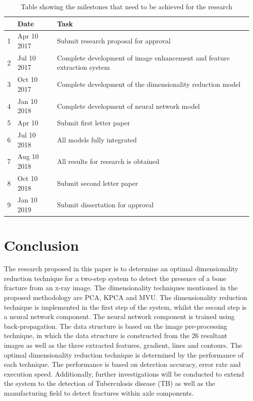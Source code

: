 \documentclass[11pt]{article}
\begin{document}
	\begin{table}[!h]
		\centering
		\caption{Table showing the milestones that need to be achieved for the research}
		\label{tb: milestones}
		\begin{tabular}{| c | l | p{11cm} |}
			\hline 
			& Date & Task \\
			\hline \hline
			1 & Apr 10 2017 & Submit research proposal for approval\\
			\hline
			2 & Jul 10 2017 & Complete development of image enhancement and feature extraction system \\
			\hline
			3 & Oct 10 2017 & Complete development of the dimensionality reduction model \\
			\hline
			4 & Jan 10 2018 & Complete development of neural network model \\
			\hline
			5 & Apr 10 & Submit first letter paper \\
			\hline
			6 & Jul 10 2018 & All models fully integrated \\
			\hline
			7 & Aug 10 2018 & All results for research is obtained \\
			\hline
			8 & Oct 10 2018 & Submit second letter paper \\
			\hline
			9 & Jan 10 2019 & Submit dissertation for approval \\
			\hline
		\end{tabular}
	\end{table}
	
	\newpage
	\section{Conclusion}
	\label{sc: Conclusion}
	The research proposed in this paper is to determine an optimal dimensionality reduction technique for a two-step system to detect the presence of a bone fracture from an x-ray image. The dimensionality techniques mentioned in the proposed methodology are PCA, KPCA and MVU. The dimensionality reduction technique is implemented in the first step of the system, whilst the second step is a neural network component. The neural network component is trained using back-propagation. The data structure is based on the image pre-processing technique, in which the data structure is constructed from the 26 resultant images as well as the three extracted features, gradient, lines and contours. The optimal dimensionality reduction technique is determined by the performance of each technique. The performance is based on detection accuracy, error rate and execution speed. Additionally, further investigations will be conducted to extend the system to the detection of Tuberculosis disease (TB) as well as the manufacturing field to detect fractures within axle components.
	
	
	
\end{document}
